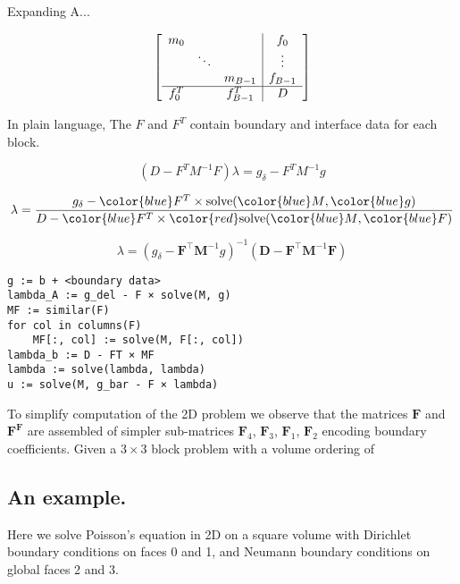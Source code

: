 Expanding A...

\begin{equation}
    \left[\begin{array}{ccc | c}
        m_0 & & & f_0 \\
        & \ddots & & \vdots \\
        & & m_{B-1} & f_{B-1} \\ \hline
        f^T_0 & & f^T_{B-1} & D
    \end{array}\right] 
\end{equation}

In plain language, The $F$ and $F^T$ contain boundary and interface data 
for each block. 

\begin{equation}
(D - F^T M^{-1} F) \lambda = g_\delta - F^T M^{-1} g
\end{equation}

\begin{equation}
 \lambda = \frac{g_\delta - {\color{blue}F^T} \times \text{solve}({\color{blue}M}, {\color{blue}g})}{D - {\color{blue}F^T} \times {\color{red}\text{solve}}({\color{blue}M}, {\color{blue}F})}
\end{equation}

\begin{equation}
    \lambda = (g_{\delta} - \textbf{F}^{\intercal} \textbf{M}^{-1} g)^{-1} (\textbf{D} - \textbf{F}^{\intercal} \textbf{M}^{-1} \textbf{F})
\end{equation}

\begin{lstlisting}
g := b + <boundary data>
lambda_A := g_del - F × solve(M, g)
MF := similar(F)
for col in columns(F)
    MF[:, col] := solve(M, F[:, col])
lambda_b := D - FT × MF
lambda := solve(lambda, lambda)
u := solve(M, g_bar - F × lambda)
\end{lstlisting}



To simplify computation of the 2D problem we observe that the matrices $\textbf{F}$ and $\textbf{F}^\textbf{F}$ are assembled of simpler sub-matrices $\textbf{F}_{4}$, $\textbf{F}_3$, $\textbf{F}_1$, $\textbf{F}_{2}$ encoding boundary coefficients. Given a $3 \times 3$ block problem with a volume ordering of 

\subsection{An example.}

\noindent 
Here we solve Poisson's equation in 2D on a square volume with Dirichlet boundary conditions on faces 0 and 1, and Neumann boundary conditions on global faces 2 and 3. 


